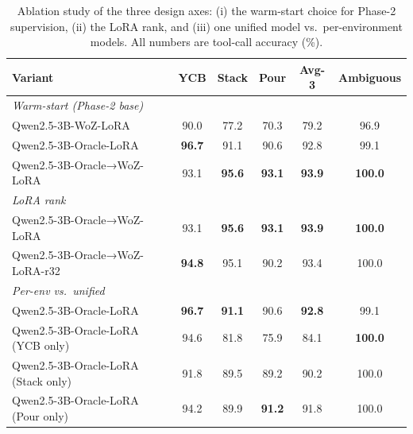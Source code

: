 \begin{table}[t]
\centering
\small
\setlength{\tabcolsep}{4pt}
\caption{Ablation study of the three design axes: (i) the warm-start choice for Phase-2 supervision, (ii) the LoRA rank, and (iii) one unified model vs.\ per-environment models. All numbers are tool-call accuracy (\%).}
\label{tab:ablations}
\begin{tabular}{lccccc}
\toprule
Variant & YCB & Stack & Pour & Avg-3 & Ambiguous \\
\midrule
\multicolumn{6}{l}{\emph{Warm-start (Phase-2 base)}} &  &  &  &  &  \\
Qwen2.5-3B-WoZ-LoRA & 90.0 & 77.2 & 70.3 & 79.2 & 96.9 \\
Qwen2.5-3B-Oracle-LoRA & \textbf{96.7} & 91.1 & 90.6 & 92.8 & 99.1 \\
Qwen2.5-3B-Oracle→WoZ-LoRA & 93.1 & \textbf{95.6} & \textbf{93.1} & \textbf{93.9} & \textbf{100.0} \\
\midrule
\multicolumn{6}{l}{\emph{LoRA rank}} &  &  &  &  &  \\
Qwen2.5-3B-Oracle→WoZ-LoRA & 93.1 & \textbf{95.6} & \textbf{93.1} & \textbf{93.9} & \textbf{100.0} \\
Qwen2.5-3B-Oracle→WoZ-LoRA-r32 & \textbf{94.8} & 95.1 & 90.2 & 93.4 & 100.0 \\
\midrule
\multicolumn{6}{l}{\emph{Per-env vs.\ unified}} &  &  &  &  &  \\
Qwen2.5-3B-Oracle-LoRA & \textbf{96.7} & \textbf{91.1} & 90.6 & \textbf{92.8} & 99.1 \\
Qwen2.5-3B-Oracle-LoRA (YCB only) & 94.6 & 81.8 & 75.9 & 84.1 & \textbf{100.0} \\
Qwen2.5-3B-Oracle-LoRA (Stack only) & 91.8 & 89.5 & 89.2 & 90.2 & 100.0 \\
Qwen2.5-3B-Oracle-LoRA (Pour only) & 94.2 & 89.9 & \textbf{91.2} & 91.8 & 100.0 \\
\bottomrule
\end{tabular}
\end{table}
